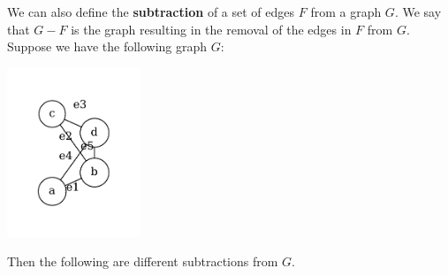 We can also define the \textbf{subtraction} of a set of edges $F$ from a graph $G$. We say that $G - F$ is the graph resulting in the removal of the edges in $F$ from $G$. Suppose we have the following graph $G$:
\begin{center}
\includegraphics[width=0.3\textwidth]{Chapter2/sub0.pdf}
\end{center}
Then the following are different subtractions from $G$.
